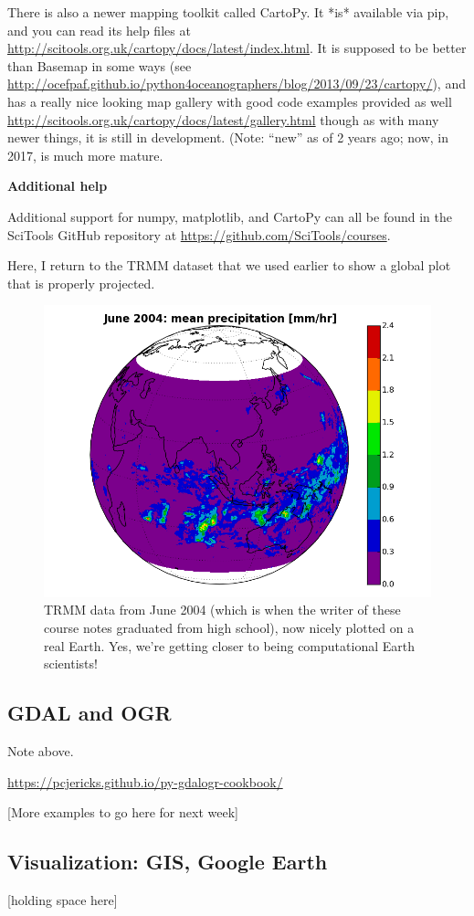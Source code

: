 \documentclass[a4paper,10pt]{scrartcl}
\begin{document}
There is also a newer mapping toolkit called CartoPy. It *is* available via pip, and you can read its help files at \url{http://scitools.org.uk/cartopy/docs/latest/index.html}. It is supposed to be better than Basemap in some ways (see \url{http://ocefpaf.github.io/python4oceanographers/blog/2013/09/23/cartopy/}), and has a really nice looking map gallery with good code examples provided as well \url{http://scitools.org.uk/cartopy/docs/latest/gallery.html} though as with many newer things, it is still in development. (Note: ``new'' as of 2 years ago; now, in 2017, is much more mature.

\begin{framed}
\noindent\textbf{Additional help}

Additional support for numpy, matplotlib, and CartoPy can all be found in the SciTools GitHub repository at \url{https://github.com/SciTools/courses}.
\end{framed}

Here, I return to the TRMM dataset that we used earlier to show a global plot that is properly projected.



\begin{figure}[!ht]
\begin{center}
\includegraphics[width=.9\linewidth]{figures/FilesData/EasternHemispherePrecip.png}
\end{center}
\caption{TRMM data from June 2004 (which is when the writer of these course notes graduated from high school), now nicely plotted on a real Earth. Yes, we're getting closer to being computational Earth scientists!}
\end{figure}

\subsection{GDAL and OGR}

Note above.

\url{https://pcjericks.github.io/py-gdalogr-cookbook/}

[More examples to go here for next week]

\subsection{Visualization: GIS, Google Earth}

[holding space here]
\end{document}
